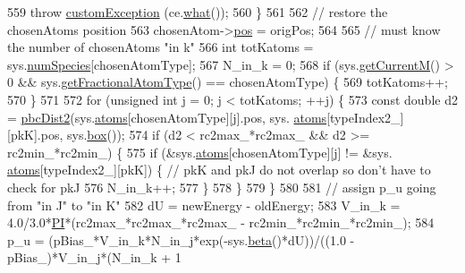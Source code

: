 \begin{DoxyCode}
559                         \textcolor{keywordflow}{throw} \hyperlink{classcustom_exception}{customException} (ce.\hyperlink{classcustom_exception_aeb6ab5848b038adfc68fde86a512f691}{what}());
560                     \}
561 
562                     \textcolor{comment}{// restore the chosenAtoms position}
563                     chosenAtom->\hyperlink{classatom_a3ae5f4880e7831d8b2c9fda72b4eb24a}{pos} = origPos;
564 
565             \textcolor{comment}{// must know the number of chosenAtoms "in k"}
566             \textcolor{keywordtype}{int} totKatoms = sys.\hyperlink{classsim_system_a9eea865e6dc1cff377b1e79c4d9c23f0}{numSpecies}[chosenAtomType];
567             N\_in\_k = 0;
568             \textcolor{keywordflow}{if} (sys.\hyperlink{classsim_system_a299fe4372e610b554eaaf5f5957b2dbc}{getCurrentM}() > 0 && sys.\hyperlink{classsim_system_a0500a9e84eecfbde7a98cf8a34f719d5}{getFractionalAtomType}() == 
      chosenAtomType) \{
569                             totKatoms++;
570                     \}
571 
572                     \textcolor{keywordflow}{for} (\textcolor{keywordtype}{unsigned} \textcolor{keywordtype}{int} j = 0; j < totKatoms; ++j) \{
573                             \textcolor{keyword}{const} \textcolor{keywordtype}{double} d2 = \hyperlink{utilities_8cpp_abb1db3a8a3ac46e044bbe7b2c5684c0a}{pbcDist2}(sys.\hyperlink{classsim_system_a90421b19082f7fb8fc23b7264b1161e4}{atoms}[chosenAtomType][j].pos, sys.
      \hyperlink{classsim_system_a90421b19082f7fb8fc23b7264b1161e4}{atoms}[typeIndex2\_][pkK].pos, sys.\hyperlink{classsim_system_a8bff9dfb95b1b09a0fab2c1c485ade07}{box}());
574                 \textcolor{keywordflow}{if} (d2 < rc2max\_*rc2max\_ && d2 >= rc2min\_*rc2min\_) \{
575                                     \textcolor{keywordflow}{if} (&sys.\hyperlink{classsim_system_a90421b19082f7fb8fc23b7264b1161e4}{atoms}[chosenAtomType][j] != &sys.
      \hyperlink{classsim_system_a90421b19082f7fb8fc23b7264b1161e4}{atoms}[typeIndex2\_][pkK]) \{ \textcolor{comment}{// pkK and pkJ do not overlap so don't have to check for pkJ}
576                         N\_in\_k++;
577                                 \}
578                 \}
579                     \}
580 
581                     \textcolor{comment}{// assign p\_u going from "in J" to "in K"}
582                     dU = newEnergy - oldEnergy;
583             V\_in\_k = 4.0/3.0*\hyperlink{global_8h_a598a3330b3c21701223ee0ca14316eca}{PI}*(rc2max\_*rc2max\_*rc2max\_ - rc2min\_*rc2min\_*rc2min\_);
584                     p\_u = (pBias\_*V\_in\_k*N\_in\_j*exp(-sys.\hyperlink{classsim_system_a3eeec9678902f8d7fce4dad6064aaf4c}{beta}()*dU))/((1.0 - pBias\_)*V\_in\_j*(N\_in\_k + 1

\end{DoxyCode}
